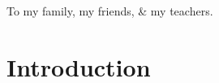 \documentclass[11pt,openright,oneside,letterpaper,onecolumn]{report}  %
\newcommand{\super}[1]{$^\text{#1}$}
\begin{document}
\pagestyle{empty}

\thesistitlepage
\thesiscopyrightpage

\thesisabstract

\listoftodos


\pagestyle{plain}

\setlength{\footskip}{0.5in}

\setcounter{tocdepth}{3}
\renewcommand{\contentsname}{Table of Contents}
\tableofcontents
\cleardoublepage

\listoffigures
{}
\cleardoublepage



\cleardoublepage

\thispagestyle{plain}
\strut \vfill
\centerline{\LARGE 
To my family, my friends, \& my teachers.
}
\vfill \strut
\cleardoublepage


\pagestyle{headings}

%
%

 {%
\setlength{\textheight}{9.0in}
\setlength{\headheight}{0pt}  %
\setlength{\headsep}{0pt}  %
\fancyhead[LE,RO]{}
\fancyhead[RE,LO]{}
\renewcommand{\headrulewidth}{0pt}
}
\newcommand{\df}{}
\def\df/{\emph{Df(16)A\super{+/-}}}
\newcommand{\scz}{}
\def\scz/{schizophrenia}
\newcommand{\Scz}{}
\def\Scz/{Schizophrenia}
\pagestyle{plain}

\part{Introduction}



\end{document}
